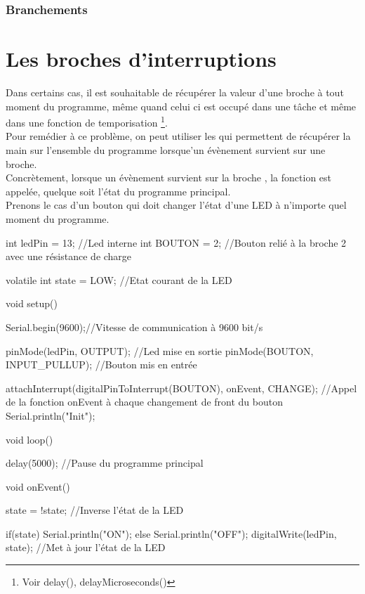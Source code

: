 \subsection{Branchements}


 \chapter{Les broches d'interruptions}

 Dans certains cas, il est souhaitable de récupérer la valeur d'une broche à tout moment du programme, même quand celui ci est occupé dans une tâche et même dans une fonction de temporisation \footnote{Voir delay(), delayMicroseconds()}. \\
 
 Pour remédier à ce problème, on peut utiliser les  qui permettent de récupérer la main sur l'ensemble du programme lorsque'un évènement survient sur une broche.\\
 
 Concrètement, lorsque un évènement   survient sur la broche , la fonction  est appelée, quelque soit l'état du programme principal. \\
 
 Prenons le cas d'un bouton qui doit changer l'état d'une LED à n'importe quel moment du programme.
 
 
\begin{Cpp}
 
     int ledPin = 13;    //Led interne
     int BOUTON = 2;  //Bouton relié à la broche 2 avec une résistance de charge
     
     volatile int state = LOW;  //Etat courant de la LED
     
     void setup() {
       
       Serial.begin(9600);//Vitesse de communication à 9600 bit/s
       
       pinMode(ledPin, OUTPUT);                //Led mise en sortie
       pinMode(BOUTON, INPUT_PULLUP);    //Bouton mis en entrée
       
       attachInterrupt(digitalPinToInterrupt(BOUTON), onEvent, CHANGE);  //Appel de la fonction onEvent à chaque changement de front du bouton
       Serial.println("Init");
     }
     
     void loop() {
       
      delay(5000); //Pause du programme principal
       
     }
     
     void onEvent() {
       
       state = !state; //Inverse l'état de la LED
       
       if(state){
         Serial.println("ON");
       }else{
         Serial.println("OFF");
       }
        digitalWrite(ledPin, state); //Met à jour l'état de la LED
     }
     
\end{Cpp}
 
